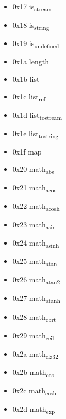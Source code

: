 \documentclass[11pt]{article}
\begin{document}
\begin{itemize}
\item 0x17 is\textsubscript{stream}

\item 0x18 is\textsubscript{string}

\item 0x19 is\textsubscript{undefined}

\item 0x1a length

\item 0x1b list

\item 0x1c list\textsubscript{ref}

\item 0x1d list\textsubscript{to}\textsubscript{stream}

\item 0x1e list\textsubscript{to}\textsubscript{string}

\item 0x1f map

\item 0x20 math\textsubscript{abs}

\item 0x21 math\textsubscript{acos}

\item 0x22 math\textsubscript{acosh}

\item 0x23 math\textsubscript{asin}

\item 0x24 math\textsubscript{asinh}

\item 0x25 math\textsubscript{atan}

\item 0x26 math\textsubscript{atan2}

\item 0x27 math\textsubscript{atanh}

\item 0x28 math\textsubscript{cbrt}

\item 0x29 math\textsubscript{ceil}

\item 0x2a math\textsubscript{clz32}

\item 0x2b math\textsubscript{cos}

\item 0x2c math\textsubscript{cosh}

\item 0x2d math\textsubscript{exp}


\end{itemize}
\end{document}

